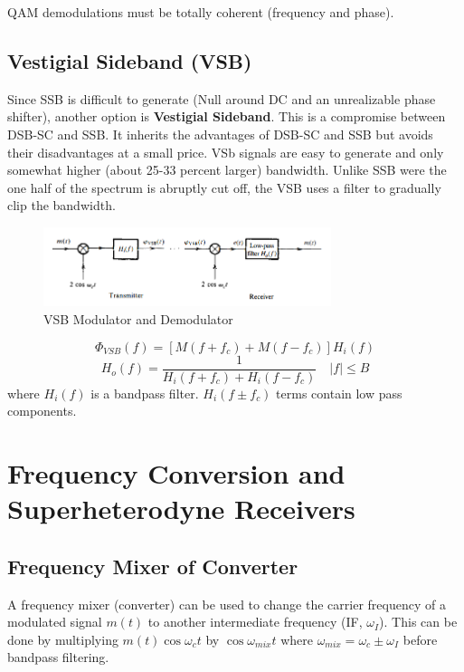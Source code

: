 \documentclass{article}
\begin{document}
    QAM demodulations must be totally coherent (frequency and phase). 

    \subsection{Vestigial Sideband (VSB)}
    Since SSB is difficult to generate (Null around DC and an unrealizable phase shifter), another option is \textbf{Vestigial Sideband}. This is a 
    compromise between DSB-SC and SSB. It inherits the advantages of DSB-SC and SSB but avoids their disadvantages at a small price. VSb signals are easy
    to generate and only somewhat higher (about 25-33 percent larger) bandwidth. Unlike SSB were the one half of the spectrum is abruptly cut off,
    the VSB uses a filter to gradually clip the bandwidth. 

    \begin{figure}[h]
        \centering
        \includegraphics[width=0.75\textwidth]{vsb_mod_demod}
        \caption{VSB Modulator and Demodulator}
    \end{figure}

    \begin{equation}
        \Phi_{VSB}(f) = [M(f+f_c) + M(f-f_c)]H_i(f)
    \end{equation}
    \begin{equation}
        H_o(f) = \frac{1}{H_i(f+f_c) + H_i(f-f_c)} \quad |f| \leq B
    \end{equation}
    where $H_i(f)$ is a bandpass filter. $H_i(f\pm f_c)$ terms contain low pass components.

    \section{Frequency Conversion and Superheterodyne Receivers}
    \subsection{Frequency Mixer of Converter}
    A frequency mixer (converter) can be used to change the carrier frequency of a modulated signal $m(t)$ to another intermediate frequency (IF, $\omega_I$). This 
    can be done by multiplying $m(t)\cos\omega_ct$ by $\cos\omega_{mix}t$ where $\omega_{mix} = \omega_c \pm \omega_I$ before bandpass filtering.
\end{document}
